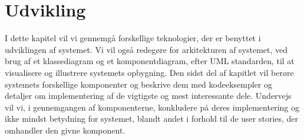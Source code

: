 \chapter{Udvikling}
I dette kapitel vil vi gennemgå forskellige teknologier, der er benyttet i udviklingen af systemet.
Vi vil også redegøre for arkitekturen af systemet, ved brug af et klassediagram og et komponentdiagram, efter UML standarden, til at visualisere og illustrere systemets opbygning.
Den sidst del af kapitlet vil berøre systemets forskellige komponenter og beskrive dem med kodeeksempler og detaljer om implementering af de vigtigste og mest interessante dele. 
Undervejs vil vi, i gennemgangen af komponenterne, konkludere på deres implementering og ikke mindst betydning for systemet, blandt andet i forhold til de user stories, der omhandler den givne komponent.









